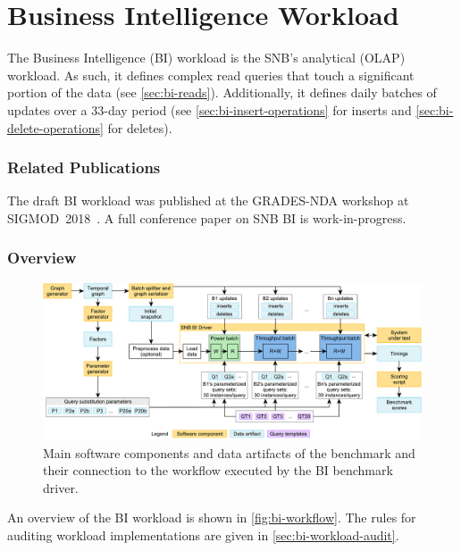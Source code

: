 \chapter{Business Intelligence Workload}
\label{sec:bi}

The Business Intelligence (BI) workload is the SNB's analytical (OLAP) workload.
As such, it defines complex read queries that touch a significant portion of the data (see \autoref{sec:bi-reads}).
Additionally, it defines daily batches of updates over a 33-day period
(see
\autoref{sec:bi-insert-operations} for inserts and
\autoref{sec:bi-delete-operations} for deletes).



\subsection*{Related Publications}

The draft BI workload was published at the \mbox{GRADES-NDA} workshop at \mbox{SIGMOD 2018}~\cite{DBLP:conf/grades/SzarnyasPAMPKEB18}.
A full conference paper on SNB BI is work-in-progress.


\subsection{Overview}
\label{sec:bi-benchmark-overview}

\begin{figure}[H]
    \centering
    \includegraphics[scale=\yedscale]{figures/bi-workflow}
    \caption{Main software components and data artifacts of the benchmark and their connection to the workflow executed by the BI benchmark driver.}
    \label{fig:bi-workflow}
\end{figure}

An overview of the BI workload is shown in \autoref{fig:bi-workflow}.
The rules for auditing workload implementations are given in \autoref{sec:bi-workload-audit}.

